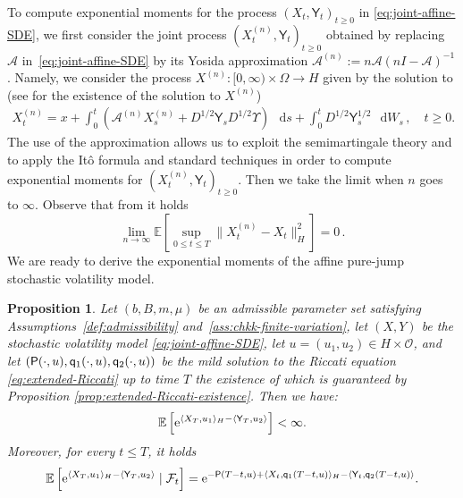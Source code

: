 \documentclass[10pt,a4paper,reqno]{amsart}
\newcommand*\D{\mathop{}\!\mathrm{d}}
\newcommand*\E{\mathop{}\!\mathrm{e}}
\numberwithin{equation}{section}
\newtheorem{proposition}[theorem]{Proposition}
\theoremstyle{plain}
\theoremstyle{definition}
\theoremstyle{example}
\newcommand{\cA}{\mathcal{A}}
\newcommand{\cO}{\mathcal{O}}
\newcommand{\sY}{\mathsf{Y}}
\newcommand{\EX}[1]{\mathbb{E}\left[#1\right]}
\begin{document}
To compute exponential moments for the process $(X_t, \sY_t)_{t\geq 0}$ in \eqref{eq:joint-affine-SDE}, we first consider
the joint process $(X^{(n)}_t, \sY_t)_{t\geq 0}$ obtained by replacing $\mathcal{A}$ in~\eqref{eq:joint-affine-SDE} by its Yosida approximation $\mathcal{A}^{(n)}:=n\mathcal{A}(nI-\mathcal{A})^{-1}$. Namely,
we consider the process $X^{(n)}\colon [0,\infty)\times \Omega \rightarrow H$ given by the solution to (see \cite[Proposition 6.4]{DZ92} for the existence of the solution to $X^{(n)}$)
\begin{align}\label{eq:approximating-Y}
X^{(n)}_{t}=x+\int_{0}^{t} (\cA^{(n)}X^{(n)}_{s}+ D^{1/2}\sY_{s}D^{1/2}\Upsilon) \,\D s+ \int_{0}^{t} D^{1/2}\sY_{s}^{1/2}\,\D W_{s}\,, \quad t\geq 0.
\end{align}
The use of the approximation allows us to exploit the semimartingale theory and to apply the It\^o formula and standard techniques in order to compute exponential moments for 
 $(X^{(n)}_t, \sY_t)_{t\geq 0}$. Then we take the limit when $n$ goes to $\infty$. Observe that from \cite[Proposition 7.5]{DZ92} it holds
 \begin{equation}\label{eq:Yosida_OU_converges}
\lim_{n \rightarrow \infty} 
\mathbb{E} \left[ 
\sup_{0 \leq t \leq T} \| X^{(n)}_t -X_t \|^2_{H} 
\right]= 0\,.
\end{equation}
We are ready to derive the exponential moments of the affine pure-jump stochastic volatility model. 
\begin{proposition}\label{prop:extended-affine-Z}
Let $(b,B,m,\mu)$ be an admissible parameter set satisfying Assumptions~\ref{def:admissibility} and~\ref{ass:chkk-finite-variation},
let $(X,Y)$ be the stochastic volatility model \eqref{eq:joint-affine-SDE},
let $u=(u_1, u_2) \in H\times \cO$, and let $({\sf P}(\cdot,u), {\sf q}_1(\cdot, u), {\sf q}_2(\cdot,u))$ be the mild solution to the Riccati equation \eqref{eq:extended-Riccati} up to time 
$T$ the existence of which is guaranteed by Proposition \ref{prop:extended-Riccati-existence}.
Then we have:
  \begin{align}
    \label{eq:extended-expo-moment-finite}
    \EX{\E^{\langle X_{T}, u_{1}\rangle_{H}-\langle {\sf Y}_{T}, u_{2}\rangle}}<\infty.
  \end{align}
  Moreover, for every $t\leq T$, it holds
  \begin{align}
    \label{eq:extended-affine-formula-intro}
    \EX{\E^{\langle X_{T}, u_{1}\rangle_{H}-\langle {\sf Y}_{T},
    u_{2}\rangle}\mid \mathcal{F}_t}=\E^{-{\sf P}(T-t,u)+\langle X_t, {\sf q}_{1}(T-t,u)\rangle_{H}-\langle {\sf Y}_t, {\sf q}_{2}(T-t,u)\rangle}. 
  \end{align}  
\end{proposition}
\end{document}
